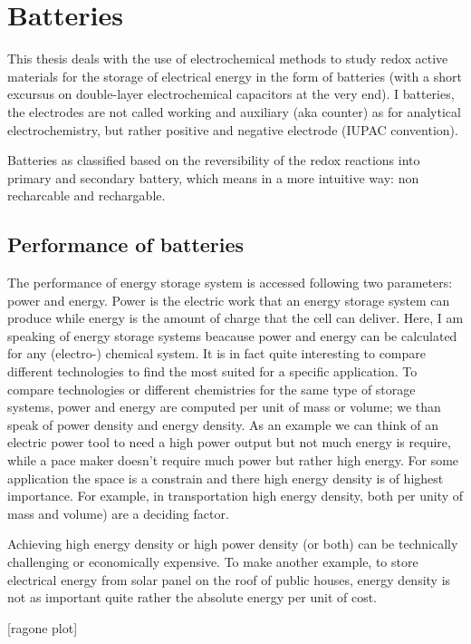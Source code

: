 \chapter{Batteries}

This thesis deals with the use of electrochemical methods to study redox active materials for the storage of electrical energy in the form of batteries (with a short excursus on double-layer electrochemical capacitors at the very end). I batteries, the electrodes are not called working and auxiliary (aka counter) as for analytical electrochemistry, but rather positive and negative electrode (IUPAC convention).

Batteries as classified based on the reversibility of the redox reactions into primary and secondary battery, which means in a more intuitive way: non recharcable and rechargable.


\section{Performance of batteries}

The performance of energy storage system is accessed following two parameters: power and energy.
Power is the electric work that an energy storage system can produce while energy is the amount of charge that the cell can deliver. Here, I am speaking of energy storage systems beacause power and energy can be calculated for any (electro-) chemical system. It is in fact quite interesting to compare different technologies to find the most suited for a specific application. To compare technologies or different chemistries for the same type of storage systems, power and energy are computed per unit of mass or volume; we than speak of power density and energy density. As an example we can think of an electric power tool to need a high power output but not much energy is require, while a pace maker doesn't require much power but rather high energy. For some application the space is a constrain and there high energy density is of highest importance. For example, in transportation high energy density, both per unity of mass and volume) are a deciding factor.

Achieving high energy density or high power density (or both) can be technically challenging or economically expensive. To make another example, to store electrical energy from solar panel on the roof of public houses, energy density is not as important quite rather the absolute energy per unit of cost.

[ragone plot]

